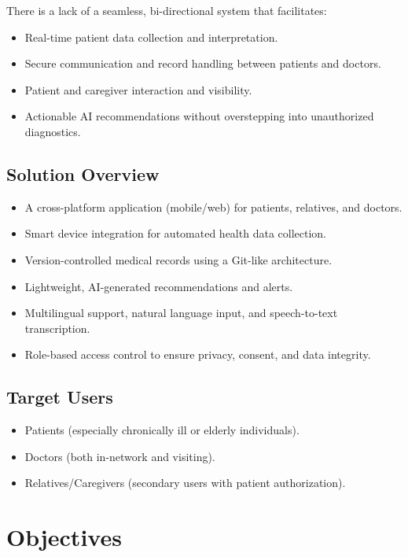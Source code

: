 \documentclass[a4paper, 12pt]{article}
\begin{document}
There is a lack of a seamless, bi-directional system that facilitates:

\begin{itemize}

\item Real-time patient data collection and interpretation.
\item Secure communication and record handling between patients and doctors.
\item Patient and caregiver interaction and visibility.
\item Actionable AI recommendations without overstepping into unauthorized diagnostics.
\end{itemize}

\subsection{Solution Overview}

\begin{itemize}

\item A cross-platform application (mobile/web) for patients, relatives, and doctors.
\item Smart device integration for automated health data collection.
\item Version-controlled medical records using a Git-like architecture.
\item Lightweight, AI-generated recommendations and alerts.
\item Multilingual support, natural language input, and speech-to-text transcription.
\item Role-based access control to ensure privacy, consent, and data integrity.
\end{itemize}


\subsection{Target Users}

\begin{itemize}
\item Patients (especially chronically ill or elderly individuals).
\item Doctors (both in-network and visiting).
\item Relatives/Caregivers (secondary users with patient authorization).
\end{itemize}


\section{Objectives}
\end{document}
